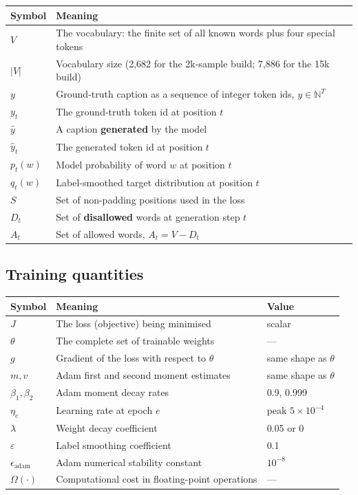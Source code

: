 \documentclass[12pt]{article}
\begin{document}
\begin{center}
\begin{tabular}{@{}lL{10cm}@{}}
\toprule
Symbol & Meaning \\
\midrule
$V$ & The vocabulary: the finite set of all known words plus four special tokens \\
$|V|$ & Vocabulary size (2,682 for the 2k-sample build; 7,886 for the 15k build) \\
$y$ & Ground-truth caption as a sequence of integer token ids, $y \in \mathbb{N}^T$ \\
$y_t$ & The ground-truth token id at position $t$ \\
$\hat{y}$ & A caption \textbf{generated} by the model \\
$\hat{y}_t$ & The generated token id at position $t$ \\
$p_t(w)$ & Model probability of word $w$ at position $t$ \\
$q_t(w)$ & Label-smoothed target distribution at position $t$ \\
$S$ & Set of non-padding positions used in the loss \\
$D_t$ & Set of \textbf{disallowed} words at generation step $t$ \\
$A_t$ & Set of allowed words, $A_t = V - D_t$ \\
\bottomrule
\end{tabular}
\end{center}

\subsection{Training quantities}

\begin{center}
\begin{tabular}{@{}lL{6.5cm}l@{}}
\toprule
Symbol & Meaning & Value \\
\midrule
$J$ & The loss (objective) being minimised & scalar \\
$\theta$ & The complete set of trainable weights & --- \\
$g$ & Gradient of the loss with respect to $\theta$ & same shape as $\theta$ \\
$m, v$ & Adam first and second moment estimates & same shape as $\theta$ \\
$\beta_1, \beta_2$ & Adam moment decay rates & 0.9, 0.999 \\
$\eta_e$ & Learning rate at epoch $e$ & peak $5\times10^{-4}$ \\
$\lambda$ & Weight decay coefficient & 0.05 or 0 \\
$\varepsilon$ & Label smoothing coefficient & 0.1 \\
$\epsilon_{\mathrm{adam}}$ & Adam numerical stability constant & $10^{-8}$ \\
$\Omega(\cdot)$ & Computational cost in floating-point operations & --- \\
\bottomrule
\end{tabular}
\end{center}
\end{document}

